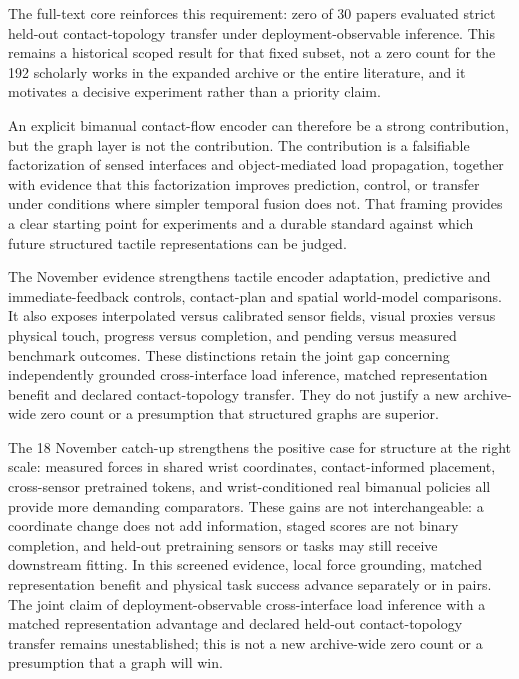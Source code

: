 The full-text core reinforces this requirement: zero of 30 papers evaluated
strict held-out contact-topology transfer under deployment-observable inference.
This remains a historical scoped result for that fixed subset, not a zero count
for the 192 scholarly works in the expanded archive or the entire literature,
and it motivates a decisive experiment rather than a priority claim.

An explicit bimanual contact-flow encoder can therefore be a strong contribution,
but the graph layer is not the contribution. The contribution is a falsifiable
factorization of sensed interfaces and object-mediated load propagation, together
with evidence that this factorization improves prediction, control, or transfer
under conditions where simpler temporal fusion does not. That framing provides a
clear starting point for experiments and a durable standard against which future
structured tactile representations can be judged.


The November evidence strengthens tactile encoder adaptation, predictive and
immediate-feedback controls, contact-plan and spatial world-model comparisons.
It also exposes interpolated versus calibrated sensor fields, visual proxies
versus physical touch, progress versus completion, and pending versus measured
benchmark outcomes. These distinctions retain the joint gap concerning
independently grounded cross-interface load inference, matched representation
benefit and declared contact-topology transfer. They do not justify a new
archive-wide zero count or a presumption that structured graphs are superior.

The 18 November catch-up strengthens the positive case for structure at the
right scale: measured forces in shared wrist coordinates, contact-informed
placement, cross-sensor pretrained tokens, and wrist-conditioned real
bimanual policies all provide more demanding comparators. These gains are not
interchangeable: a coordinate change does not add information, staged scores
are not binary completion, and held-out pretraining sensors or tasks may still
receive downstream fitting. In this screened evidence, local force grounding,
matched representation benefit and physical task success advance separately or
in pairs. The joint claim of deployment-observable cross-interface load
inference with a matched representation advantage and declared held-out
contact-topology transfer remains unestablished; this is not a new archive-wide
zero count or a presumption that a graph will win.

